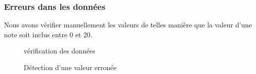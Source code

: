 \documentclass{article}
\begin{document}
            \subsubsection{Erreurs dans les données}
            Nous avons vérifier manuellement les valeurs de telles manière que la valeur d’une note soit inclus entre 0 et 20. 
            \begin{figure}[h!]
                \centering
                \caption{vérification des données}
                \label{fig:15}
            \end{figure}  
            \begin{figure}[h!]
                \centering
                \caption{Détection d’une valeur erronée}
                \label{fig:16}
            \end{figure} 
\end{document}
